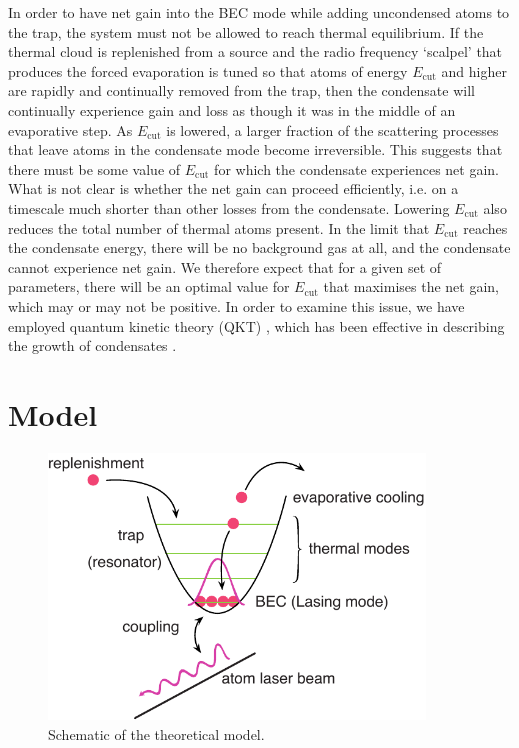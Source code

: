 In order to have net gain into the BEC mode while adding uncondensed atoms to the trap, the system must not be allowed to reach thermal equilibrium. If the thermal cloud is replenished from a source and the radio frequency `scalpel' that produces the forced evaporation is tuned so that atoms of energy $E_\text{cut}$ and higher are rapidly and continually removed from the trap, then the condensate will continually experience gain and loss as though it was in the middle of an evaporative step. As $E_\text{cut}$ is lowered, a larger fraction of the scattering processes that leave atoms in the condensate mode become irreversible. This suggests that there must be some value of $E_\text{cut}$ for which the condensate experiences net gain. What is not clear is whether the net gain can proceed efficiently, i.e. on a timescale much shorter than other losses from the condensate. Lowering $E_\text{cut}$ also reduces the total number of thermal atoms present. In the limit that $E_\text{cut}$ reaches the condensate energy, there will be no background gas at all, and the condensate cannot experience net gain. We therefore expect that for a given set of parameters, there will be an optimal value for $E_\text{cut}$ that maximises the net gain, which may or may not be positive. In order to examine this issue, we have employed quantum kinetic theory (QKT) \citep{Gardiner:1997tz,Jaksch:1997ug,Gardiner:1998wx,Jaksch:1998sj,Gardiner:2000ug,Lee:2000vs,Davis:2000vn}, which has been effective in describing the growth of condensates \citep{Davis:2000vn}.


\section{Model}
\label{KineticTheory:Model}

\begin{figure}
    \centering
        \includegraphics[width=10cm]{QKTModel}
    \caption{Schematic of the theoretical model.}
    \label{KineticTheory:QKTModel}
\end{figure}

